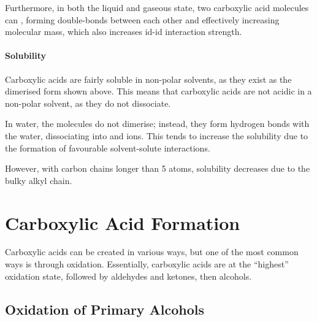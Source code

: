 		\pagebreak
		Furthermore, in both the liquid and gaseous state, two carboxylic acid molecules can , forming double-bonds between
		each other and effectively increasing molecular mass, which also increases id-id interaction strength.




		\paragraph{Solubility}

		Carboxylic acids are fairly soluble in non-polar solvents, as they exist as the dimerised form shown above. This means that carboxylic acids
		are not acidic in a non-polar solvent, as they do not dissociate.

		In water, the molecules do not dimerise; instead, they form hydrogen bonds with the water, dissociating into  and  ions.
		This tends to increase the solubility due to the formation of favourable solvent-solute interactions.

		However, with carbon chains longer than 5 atoms, solubility decreases due to the bulky alkyl chain.



	\pagebreak
	\section{Carboxylic Acid Formation}

		Carboxylic acids can be created in various ways, but one of the most common ways is through oxidation. Essentially, carboxylic acids
		are at the \enquote{highest} oxidation state, followed by aldehydes and ketones, then alcohols.

		\subsection{Oxidation of Primary Alcohols}

